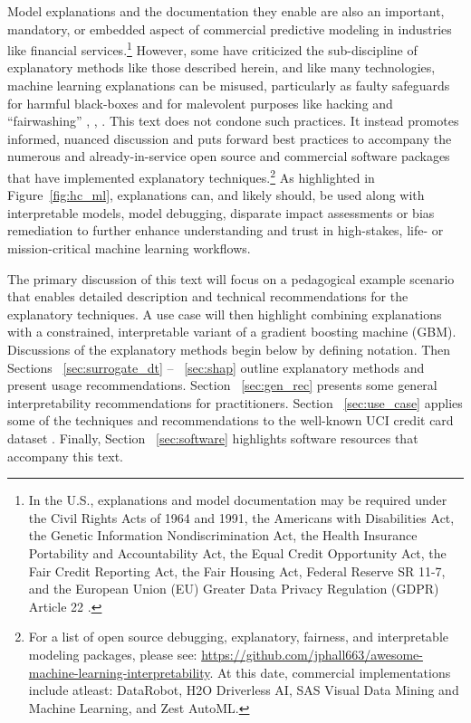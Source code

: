 \documentclass[sigconf]{acmart}
\begin{document}
Model explanations and the documentation they enable are also an important, mandatory, or embedded aspect of commercial predictive modeling in industries like financial services.\footnote{In the U.S., explanations and model documentation may be required under the Civil Rights Acts of 1964 and 1991, the Americans with Disabilities Act, the Genetic Information Nondiscrimination Act, the Health Insurance Portability and Accountability Act, the Equal Credit Opportunity Act, the Fair Credit Reporting Act, the Fair Housing Act, Federal Reserve SR 11-7, and the European Union (EU) Greater Data Privacy Regulation (GDPR) Article 22 \cite{ff_interpretability}.} However, some have criticized the sub-discipline of explanatory methods like those described herein, and like many technologies, machine learning explanations can be misused, particularly as faulty safeguards for harmful black-boxes and for malevolent purposes like hacking and ``fairwashing'' \cite{fair_washing}, \cite{security_of_ml}, \cite{please_stop}. This text does not condone such practices. It instead promotes informed, nuanced discussion and puts forward best practices to accompany the numerous and already-in-service open source and commercial software packages that have implemented explanatory techniques.\footnote{For a list of open source debugging, explanatory, fairness, and interpretable modeling packages, please see: \url{https://github.com/jphall663/awesome-machine-learning-interpretability}. At this date, commercial implementations include atleast: DataRobot, H2O Driverless AI, SAS Visual Data Mining and Machine Learning, and Zest AutoML.} As highlighted in Figure~\ref{fig:hc_ml}, explanations can, and likely should, be used along with interpretable models, model debugging, disparate impact assessments or bias remediation to further enhance understanding and trust in high-stakes, life- or mission-critical machine learning workflows.

The primary discussion of this text will focus on a pedagogical example scenario that enables detailed description and technical recommendations for the explanatory techniques. A use case will then highlight combining explanations with a constrained, interpretable variant of a gradient boosting machine (GBM). Discussions of the explanatory methods begin below by defining notation. Then Sections ~\ref{sec:surrogate_dt} -- ~\ref{sec:shap} outline explanatory methods and present usage recommendations. Section ~\ref{sec:gen_rec} presents some general interpretability recommendations for practitioners. Section ~\ref{sec:use_case} applies some of the techniques and recommendations to the well-known UCI credit card dataset \cite{uci}. Finally, Section ~\ref{sec:software} highlights software resources that accompany this text. 
\end{document}
